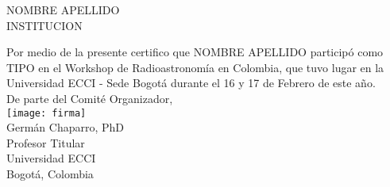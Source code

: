 \documentclass[
	pagenumber=false, %
	parskip=half, %
	fromalign=right, %
	foldmarks=false, %
	addrfield=true %
	]{scrlttr2}
\date{Febrero 17 de 2018} %
\begin{document}
 
\begin{letter}{NOMBRE APELLIDO\\INSTITUCION\\} %



\opening{}


Por medio de la presente certifico que NOMBRE APELLIDO particip\'o como TIPO en el Workshop de Radioastronom\'ia en Colombia, que tuvo lugar en la Universidad ECCI - Sede Bogot\'a durante el 16 y 17 de Febrero de este a\~no.\\


De parte del Comit\'e Organizador,\\

\texttt{[image: firma]}\\
Germ\'an Chaparro, PhD\\Profesor Titular\\Universidad ECCI\\Bogot\'a, Colombia




\end{letter}
 
\end{document}
